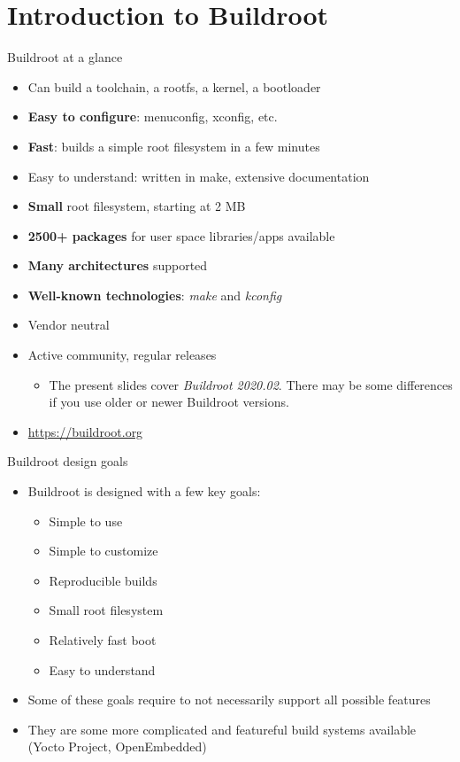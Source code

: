 \section{Introduction to Buildroot}

\begin{frame}{Buildroot at a glance}
  \begin{itemize}
  \item Can build a toolchain, a rootfs, a kernel, a bootloader
  \item {\bf Easy to configure}: menuconfig, xconfig, etc.
  \item {\bf Fast}: builds a simple root filesystem in a few minutes
  \item Easy to understand: written in make, extensive documentation
  \item {\bf Small} root filesystem, starting at 2 MB
  \item {\bf 2500+ packages} for user space libraries/apps available
  \item {\bf Many architectures} supported
  \item {\bf Well-known technologies}: {\em make} and {\em kconfig}
  \item Vendor neutral
  \item Active community, regular releases
    \begin{itemize}
    \item The present slides cover {\em Buildroot 2020.02}. There may
      be some differences if you use older or newer Buildroot versions.
    \end{itemize}
  \item \url{https://buildroot.org}
  \end{itemize}
\end{frame}

\begin{frame}{Buildroot design goals}
  \begin{itemize}
  \item Buildroot is designed with a few key goals:
    \begin{itemize}
    \item Simple to use
    \item Simple to customize
    \item Reproducible builds
    \item Small root filesystem
    \item Relatively fast boot
    \item Easy to understand
    \end{itemize}
  \item Some of these goals require to not necessarily support all
    possible features
  \item They are some more complicated and featureful build systems
    available (Yocto Project, OpenEmbedded)
  \end{itemize}
\end{frame}

